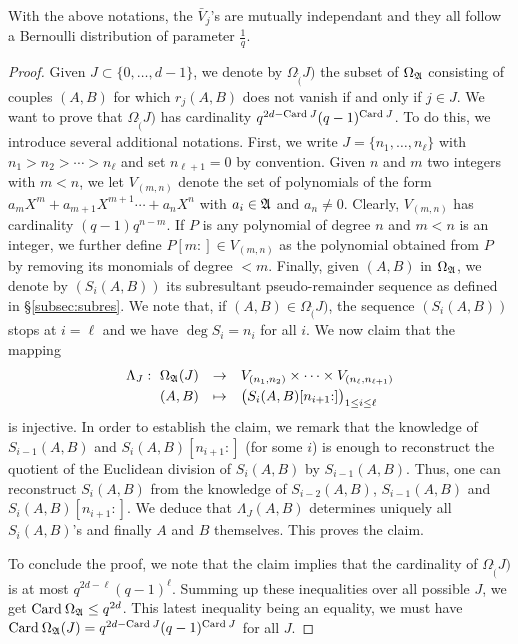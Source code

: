 \documentclass{article}
\begin{document}
\begin{prop}
\label{prop:distribk}
With the above notations, the $\bar V_j$'s are mutually independant
and they all follow a Bernoulli distribution of parameter $\frac 1 q$.
\end{prop}

\begin{proof} 
Given $J \subset \{0, \ldots, d-1\}$, we denote by 
$\Omega_\ring(J)$ the subset of $\Omega_\mathfrak A$ consisting of
couples $(A,B)$ for which $r_j(A,B)$ does not vanish if and only if $j 
\in J$. We want to prove that $\Omega_\ring(J)$ has cardinality 
$q^{2d-\text{\rm Card}\: J} (q-1)^{\text{\rm Card}\: J}$. To do this, we introduce several 
additional notations. First, we write $J = \{n_1, \ldots, 
n_\ell\}$ with $n_1 > n_2 > \cdots > n_\ell$ and set $n_{\ell+1} = 
0$ by convention. Given $n$ and $m$ two integers with $m < n$, we let 
$V_{(m,n)}$ denote the set of polynomials of the form
$a_m X^m + a_{m+1} X^{m+1} \cdots + a_n X^n$
with $a_i \in \mathfrak A$ and $a_n \neq 0$. Clearly, $V_{(m,n)}$ has
cardinality $(q-1) q^{n-m}$. If $P$ is any polynomial of 
degree $n$ and $m < n$ is an integer, we further define $P[m{:}] \in 
V_{(m,n)}$ as the polynomial obtained from $P$ by removing its monomials 
of degree $< m$. Finally, given $(A,B)$ in $\Omega_\mathfrak A$, we 
denote by $(S_i(A,B))$ its subresultant pseudo-remainder sequence as 
defined in \S \ref{subsec:subres}. We note that, if $(A,B) \in 
\Omega_\ring(J)$, the sequence $(S_i(A,B))$ stops at $i = \ell$ and we 
have $\deg S_i = n_i$ for all $i$. We now claim that the mapping
$$\begin{array}{rcl} 
\Lambda_J : \,\, 
\Omega_\ring(J) & \to & 
V_{(n_1,n_2)} \times \cdots \times V_{(n_\ell,n_{\ell+1})} \smallskip \\
(A,B) & \mapsto & 
\big(S_i(A,B)[n_{i+1}{:}]\big)_{1 \leq i \leq \ell}
\end{array}$$ 
is injective. In order to establish the claim, we remark that the 
knowledge of $S_{i-1}(A,B)$ and $S_i(A,B)[n_{i+1}{:}]$ (for some $i$) 
is enough to reconstruct the quotient of the Euclidean division of 
$S_i(A,B)$ by $S_{i-1}(A,B)$. Thus, one can reconstruct $S_i(A,B)$ from 
the knowledge of 
$S_{i-2}(A,B)$, $S_{i-1}(A,B)$ and $S_i(A,B)[n_{i+1}{:}]$. We deduce 
that $\Lambda_J(A,B)$ determines uniquely all $S_i(A,B)$'s 
and finally $A$ and $B$ themselves. This proves the claim.

To conclude the proof, we note that the claim implies that the cardinality of 
$\Omega_\ring(J)$ is at most $q^{2d-\ell} (q-1)^\ell$. Summing up these 
inequalities over all possible $J$, we get $\text{\rm Card}\: \Omega_\mathfrak A \leq 
q^{2d}$. This latest inequality being an equality, we must have
$\text{\rm Card}\: \Omega_\mathfrak A(J) = q^{2d-\text{\rm Card}\: J} (q-1)^{\text{\rm Card}\: J}$ for all $J$.
\end{proof}
\end{document}
